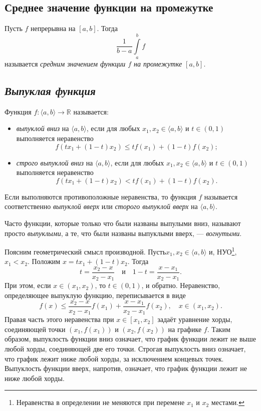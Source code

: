 \subsection{Среднее значение функции на промежутке}

\hypertarget{average}{}
\begin{definition}
	Пусть $f$ непрерывна на $[a, b]$. Тогда \[
		\dfrac1{b - a}\int\limits_a^b f
	\]
	называется \textit{средним значением функции $f$ на промежутке $[a, b]$}.
\end{definition}

\subsection{\itshape Выпуклая функция}

\begin{definition}
	Функция \(f \colon \langle a, b \rangle \to \mathbb{R}\) называется:
	\begin{itemize}
		\item \textit{выпуклой вниз} на \(\langle a, b \rangle\), если для любых \(x_1, x_2 \in \langle a, b \rangle\) и \(t \in (0, 1)\) выполняется неравенство \[
		f(t x_1 + (1 - t) x_2) \leqslant t f(x_1) + (1 - t) f(x_2);
		\]
		\item \textit{строго выпуклой вниз} на \(\langle a, b \rangle\), если для любых \(x_1, x_2 \in \langle a, b \rangle\) и \(t \in (0, 1)\) выполняется неравенство \[
		f(t x_1 + (1 - t) x_2) < t f(x_1) + (1 - t) f(x_2).
		\]
	\end{itemize}
	
	Если выполняются противоположные неравенства, то функция \(f\) называется соответственно \textit{выпуклой вверх} или \textit{сторого выпуклой вверх} на \(\langle a, b \rangle\).
	
	Часто функции, которые только что были названы выпулыми вниз, называют просто \textit{выпуклыми}, а те, что были названы выпуклыми вверх, --- \textit{вогнутыми}.
	
	Поясним геометрический смысл производной. Пусть\(x_1, x_2 \in \langle a, b \rangle\) и, НУО\footnote{Неравенства в определении не меняются при перемене \(x_1\) и \(x_2\) местами.}, \(x_1 < x_2\). Положим \(x = t x_1 + (1 - t) x_2\). Тогда \[
		t = \frac{x_2 - x}{x_2 - x_1} \quad \text{и} \quad 1 - t = \frac{x - x_1}{x_2 - x_1}.
	\]
	При этом, если \(x \in (x_1, x_2)\), то \(t \in (0, 1)\), и обратно. Неравенство, определяющее выпуклую функцию, переписывается в виде \[
		f(x) \leqslant \frac{x_2 - x}{x_2 - x_1} f(x_1) + \frac{x - x_1}{x_2 - x_1} f(x_2), \quad x \in (x_1, x_2).
	\]
	Правая часть этого неравенства при \(x \in [x_1, x_2]\) задаёт уравнение хорды, соединяющей точки \((x_1, f(x_1))\) и \((x_2, f(x_2))\) на графике \(f\). Таким образом, выпуклость функции вниз означает, что график функции лежит не выше любой хорды, соединяющей две его точки. Строгая выпуклость вниз означает, что график лежит ниже любой хорды, за исключением концевых точек. Выпуклость функции вверх, напротив, означает, что график функции лежит не ниже любой хорды.
\end{definition}

